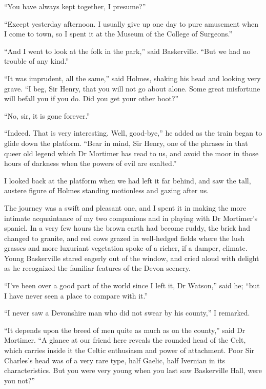 \documentclass[paper=5.5in:8.5in,BCOR=7mm,twoside,DIV=calc,12pt,usegeometry,openany,chapterprefix,endperiod,headings=big]{scrbook} %
\begin{document}
\enquote{You have always kept together, I presume?}

\enquote{Except yesterday afternoon. I usually give up one day to pure amusement when I come to town, so I spent it at the Museum of the College of Surgeons.}

\enquote{And I went to look at the folk in the park,} said Baskerville. \enquote{But we had no trouble of any kind.}

\enquote{It was imprudent, all the same,} said Holmes, shaking his head and looking very grave. \enquote{I beg, Sir Henry, that you will not go about alone. Some great misfortune will befall you if you do. Did you get your other boot?}

\enquote{No, sir, it is gone forever.}

\enquote{Indeed. That is very interesting. Well, good-bye,} he added as the train began to glide down the platform. \enquote{Bear in mind, Sir Henry, one of the phrases in that queer old legend which Dr Mortimer has read to us, and avoid the moor in those hours of darkness when the powers of evil are exalted.}

I looked back at the platform when we had left it far behind, and saw the tall, austere figure of Holmes standing motionless and gazing after us.

The journey was a swift and pleasant one, and I spent it in making the more intimate acquaintance of my two companions and in playing with Dr Mortimer's spaniel. In a very few hours the brown earth had become ruddy, the brick had changed to granite, and red cows grazed in well-hedged fields where the lush grasses and more luxuriant vegetation spoke of a richer, if a damper, climate. Young Baskerville stared eagerly out of the window, and cried aloud with delight as he recognized the familiar features of the Devon scenery.

\enquote{I've been over a good part of the world since I left it, Dr Watson,} said he; \enquote{but I have never seen a place to compare with it.}

\enquote{I never saw a Devonshire man who did not swear by his county,} I remarked.

\enquote{It depends upon the breed of men quite as much as on the county,} said Dr Mortimer. \enquote{A glance at our friend here reveals the rounded head of the Celt, which carries inside it the Celtic enthusiasm and power of attachment. Poor Sir Charles's head was of a very rare type, half Gaelic, half Ivernian in its characteristics. But you were very young when you last saw Baskerville Hall, were you not?}
\end{document}
